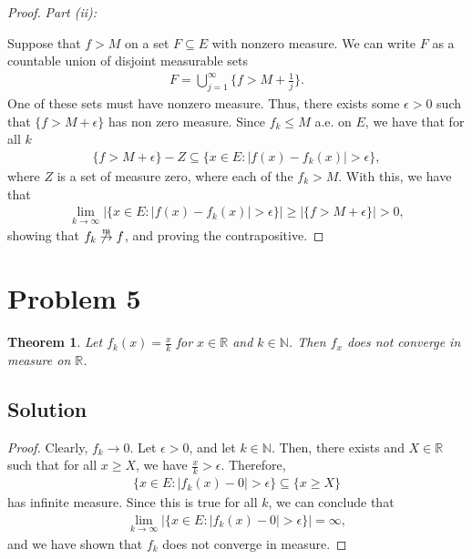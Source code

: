 \documentclass[10pt,a4paper]{article}
\makeatletter
\theoremstyle{theorem}
\newtheorem{theorem}{Theorem}
\newcommand{\proofpart}[2]{%
  \par
  \addvspace{\medskipamount}%
  \noindent\emph{Part #1: #2}\par\nobreak
  \addvspace{\smallskipamount}%
  \@afterheading
}
\theoremstyle{definition}
\makeatother
\begin{document}
\begin{proof}
\proofpart{(ii)}{}
Suppose that $f > M$ on a set $F \subseteq E$ with nonzero measure. We can write $F$ as a countable union of disjoint measurable sets
\begin{align*}
F =\bigcup_{j = 1}^\infty \{f > M + \frac{1}{j} \}.
\end{align*}
One of these sets must have nonzero measure. Thus, there exists some $\epsilon > 0$ such that $\{f > M + \epsilon\}$ has non zero measure. Since $f_k \leq M$ a.e. on $E$, we have that for all $k$
\begin{align*}
\{f > M + \epsilon\} - Z \subseteq \{x \in E: |f(x) - f_k(x)| > \epsilon \},
\end{align*}
where $Z$ is a set of measure zero, where each of the $f_k > M$. With this, we have that
\begin{align*}
\lim_{k \to \infty} |\{x \in E: |f(x) - f_k(x)| > \epsilon \}|\geq  |\{f > M + \epsilon\}| > 0,
\end{align*}
showing that $f_k \not \overset{\text{m}}{\to} f$, and proving the contrapositive.
\end{proof}

\section*{Problem 5}
\begin{theorem}
Let $f_k(x) = \frac{x}{k}$ for $x \in \mathbb{R}$ and $k \in \mathbb{N}$. Then $f_x$ does not converge in measure on $\mathbb{R}$.
\end{theorem}

\subsection*{Solution}
\begin{proof}
Clearly, $f_k \to 0$. Let $\epsilon > 0$, and let $k \in \mathbb{N}$. Then, there exists and $X \in \mathbb{R}$ such that for all $x \geq X$,  we have $\frac{x}{k} > \epsilon$. Therefore, 
\begin{align*}
\{x \in E: |f_k(x) - 0| > \epsilon \} \subseteq \{x \geq X \}
\end{align*}
has infinite measure. Since this is true for all $k$, we can conclude that 
\begin{align*}
\lim_{k \to \infty} |\{x \in E: |f_k(x) - 0| > \epsilon \}| = \infty,
\end{align*}
and we have shown that $f_k$ does not converge in measure.
\end{proof}
\end{document}
